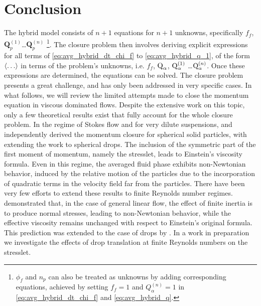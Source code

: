 \section{Conclusion}
\label{sec:conclusion}


The hybrid model consists of $n+1$ equations for $n+1$ unknowns, specifically $f_f$, $\textbf{Q}_p^{(1)}$\ldots$\textbf{Q}_p^{(n)}$ \footnote{$\phi_f$ and $n_p$ can also be treated as unknowns by adding corresponding equations, achieved by setting $f_f=1$ and $Q_\alpha^{(n)} =1$ in \ref{eq:avg_hybrid_dt_chi_f} and \ref{eq:avg_hybrid_q}.}.
The closure problem then involves deriving explicit expressions for all terms of \ref{eq:avg_hybrid_dt_chi_f} to \ref{eq:avg_hybrid_q_1}, of the form $\left<\ldots\right>$ in terms of the problem's unknowns, i.e. 
$f_f$, $\text Q_\alpha$, $\text Q_\alpha^{(1)}$ \ldots $ \text Q_\alpha^{(n)}$.  
Once these expressions are determined, the equations can be solved. 
The closure problem presents a great challenge, and has only been addressed in very specific cases. 
In what follows, we will review the limited attempts made to close the momentum equation in viscous dominated flows. 
Despite the extensive work on this topic, only a few theoretical results exist that fully account for the whole closure problem. 
In the regime of Stokes flow and for very dilute suspensions, \citet{jackson1997locally} and \citet{zhang1997momentum} independently derived the momentum closure for spherical solid particles, with \citet{zhang1997momentum}  extending the work to spherical drops. 
The inclusion of the symmetric part of the first moment of momentum, namely the stresslet, leads to Einstein's viscosity formula. 
Even in this regime, the averaged fluid phase exhibits non-Newtonian behavior, induced by the relative motion of the particles due to the incorporation of quadratic terms in the velocity field far from the particles.
There have been very few efforts to extend these results to finite Reynolds number regimes. \citet{stone2001inertial} demonstrated that, in the case of general linear flow, the effect of finite inertia is to produce normal stresses, leading to non-Newtonian behavior, while the effective viscosity remains unchanged with respect to Einstein's original formula. 
This prediction was extended to the case of drops by \citet{raja2010inertial}. 
In a work in preparation we investigate the effects of drop translation at finite Reynolds numbers on the stresslet. 



